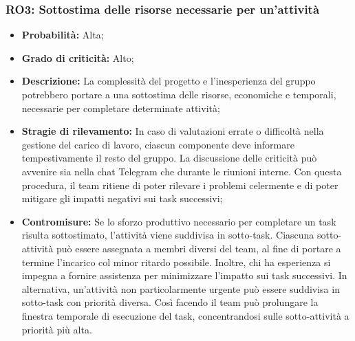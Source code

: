 \subsubsection{RO3: Sottostima delle risorse necessarie per un'attività}
\begin{itemize}
    \item \textbf{Probabilità:} Alta;
    \item \textbf{Grado di criticità:} Alto;
    \item \textbf{Descrizione:} La complessità del progetto e l'inesperienza del gruppo potrebbero portare a una sottostima delle risorse, economiche e temporali, necessarie per completare determinate attività;
    \item \textbf{Stragie di rilevamento:} In caso di valutazioni errate o difficoltà nella gestione del carico di lavoro, ciascun componente deve informare tempestivamente il resto del gruppo. La discussione delle criticità può avvenire sia nella chat Telegram che durante le riunioni interne. Con questa procedura, il team ritiene di poter rilevare i problemi celermente e di poter mitigare gli impatti negativi sui task successivi;
    \item \textbf{Contromisure:} Se lo sforzo produttivo necessario per completare un task risulta sottostimato, l'attività viene suddivisa in sotto-task. Ciascuna sotto-attività può essere assegnata a membri diversi del team, al fine di portare a termine l’incarico col minor ritardo possibile. Inoltre, chi ha esperienza si impegna a fornire assistenza per minimizzare l'impatto sui task successivi. In alternativa, un’attività non particolarmente urgente può essere suddivisa in sotto-task con priorità diversa. Così facendo il team può prolungare la finestra temporale di esecuzione del task, concentrandosi sulle sotto-attività a priorità più alta.
\end{itemize}
